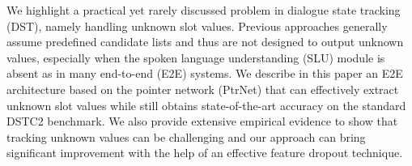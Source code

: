 We highlight a practical yet rarely discussed problem in dialogue state tracking (DST), namely handling unknown slot values. Previous approaches generally assume predefined candidate lists and thus are not designed to output unknown values, especially when the spoken language understanding (SLU) module is absent as in many end-to-end (E2E) systems. We describe in this paper an E2E architecture based on the pointer network (PtrNet) that can effectively extract unknown slot values while still obtains state-of-the-art accuracy on the standard DSTC2 benchmark. We also provide extensive empirical evidence to show that tracking unknown values can be challenging and our approach can bring significant improvement with the help of an effective feature dropout technique.
